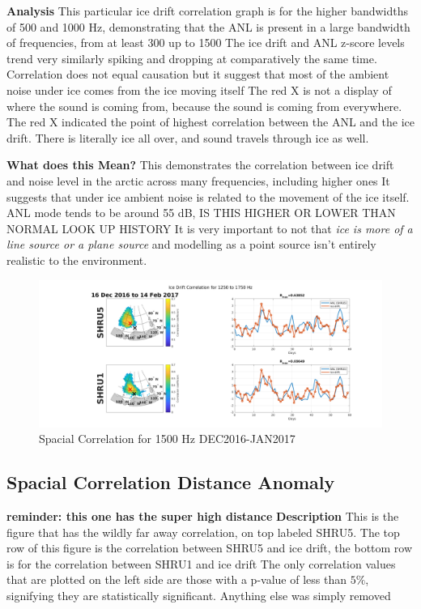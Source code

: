 \textbf{Analysis}
This particular ice drift correlation graph is for the higher bandwidths of 500 and 1000 Hz, demonstrating that the ANL is present in a large bandwidth of frequencies, from at least 300 up to 1500
The ice drift and ANL z-score levels trend very similarly spiking and dropping at comparatively the same time. Correlation does not equal causation but it suggest that most of the ambient noise under ice comes from the ice moving itself
The red X is not a display of where the sound is coming from, because the sound is coming from everywhere. The red X indicated the point of highest correlation between the ANL and the ice drift. There is literally ice all over, and sound travels through ice as well.

\textbf{What does this Mean?}
This demonstrates the correlation between ice drift and noise level in the arctic across many frequencies, including higher ones
It suggests that under ice ambient noise is related to the movement of the ice itself. ANL mode tends to be around 55 dB, IS THIS HIGHER OR LOWER THAN NORMAL LOOK UP HISTORY
It is very important to not that \textit{ice is more of a line source or a plane source} and modelling as a point source isn't entirely realistic to the environment.

\begin{figure}[h]
\centering
\includegraphics[scale=0.4]{Figures/spatial_corr_20161216-20170214.png}
\caption{Spacial Correlation for 1500 Hz DEC2016-JAN2017}
\label{fig_1500corr}
\end{figure}

\subsection{Spacial Correlation Distance Anomaly}
\textbf{reminder: this one has the super high distance}
\textbf{Description}
This is the figure that has the wildly far away correlation, on top labeled SHRU5. 
The top row of this figure is the correlation between SHRU5 and ice drift, the bottom row is for the correlation between SHRU1 and ice drift
The only correlation values that are plotted on the left side are those with a p-value of less than {$5\%$}, signifying they are statistically significant. Anything else was simply removed 

